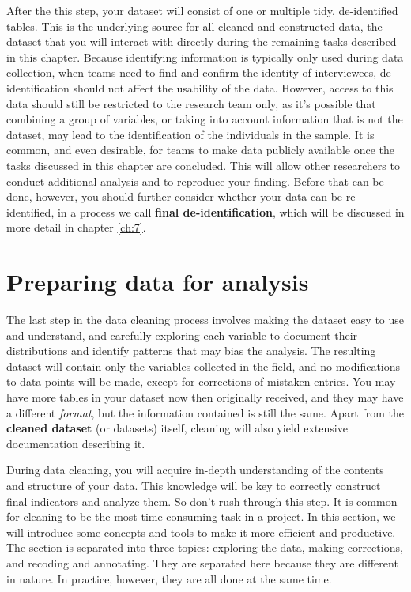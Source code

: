 After the this step, your dataset will consist of one or multiple tidy, 
de-identified tables.
This is the underlying source for all cleaned and constructed data,
the dataset that you will interact with directly during the remaining tasks described in this chapter.
Because identifying information is typically only used during data collection,
when teams need to find and confirm the identity of interviewees,
de-identification should not affect the usability of the data.
However, access to this data should still be restricted to the research team only,
as it's possible that combining a group of variables,
or taking into account information that is not the dataset,
may lead to the identification of the individuals in the sample.
It is common, and even desirable, for teams to make data publicly available
once the tasks discussed in this chapter are concluded.
This will allow other researchers to conduct additional analysis and to reproduce your finding.
Before that can be done, however,
you should further consider whether your data can be re-identified,
in a process we call \textbf{final de-identification},
which will be discussed in more detail in chapter \ref{ch:7}.


\section{Preparing data for analysis}

The last step in the data cleaning process involves
making the dataset easy to use and understand, and 
carefully exploring each variable to document their distributions 
and identify patterns that may bias the analysis.
The resulting dataset will contain only the variables collected in the field, and
no modifications to data points will be made, 
except for corrections of mistaken entries.
You may have more tables in your dataset now then originally received,
and they may have a different \textit{format},
but the information contained is still the same.
Apart from the \textbf{cleaned dataset} (or datasets) itself,
cleaning will also yield extensive documentation describing  it.

During data cleaning, you will acquire in-depth understanding of the contents and structure of your data.
This knowledge will be key to correctly construct final indicators and analyze them.
So don't rush through this step.
It is common for cleaning to be the most time-consuming task in a project.
In this section, we will introduce some concepts and tools to make it more efficient and productive.
The section is separated into three topics:
exploring the data, making corrections, and recoding and annotating.
They are separated here because they are different in nature.
In practice, however, they are all done at the same time.


